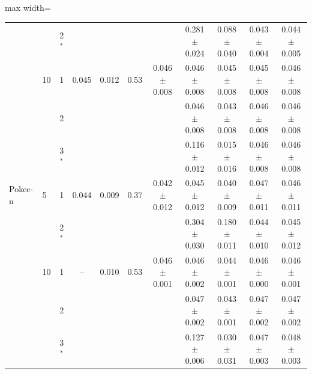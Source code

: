 \begin{table}[tbp]
\begin{adjustbox}{max width=\textwidth}
\begin{tabular}{llccccccccc}
 &  & 2$^\ast$ &  & &  &  & 0.281$\pm$0.024 & 0.088$\pm$0.040 & 0.043$\pm$0.004 & 0.044$\pm$0.005 \\
 & 10 & 1 & 0.045 & 0.012 & 0.53 & 0.046$\pm$0.008 & 0.046$\pm$0.008 & 0.045$\pm$0.008 & 0.045$\pm$0.008 & 0.046$\pm$0.008 \\
 &  & 2 &  & &  &  & 0.046$\pm$0.008 & 0.043$\pm$0.008 & 0.046$\pm$0.008 & 0.046$\pm$0.008 \\
 &  & 3$^\ast$ &  & &  &  & 0.116$\pm$0.012 & 0.015$\pm$0.016 & 0.046$\pm$0.008 & 0.046$\pm$0.008 \\
\midrule
Pokec-n & 5 & 1 & 0.044 & 0.009 & 0.37 & 0.042$\pm$0.012 & 0.045$\pm$0.012 & 0.040$\pm$0.009 & 0.047$\pm$0.011 & 0.046$\pm$0.011 \\
 &  & 2$^\ast$ &  & &  &  & 0.304$\pm$0.030 & 0.180$\pm$0.011 & 0.044$\pm$0.010 & 0.045$\pm$0.012 \\
 & 10 & 1 & -- & 0.010 & 0.53 & 0.046$\pm$0.001 & 0.046$\pm$0.002 & 0.044$\pm$0.001 & 0.046$\pm$0.000 & 0.046$\pm$0.001 \\
 &  & 2 &  & &  &  & 0.047$\pm$0.002 & 0.043$\pm$0.001 & 0.047$\pm$0.002 & 0.047$\pm$0.002 \\
 &  & 3$^\ast$ &  & &  &  & 0.127$\pm$0.006 & 0.030$\pm$0.031 & 0.047$\pm$0.003 & 0.048$\pm$0.003 \\
\bottomrule
\end{tabular}
\end{adjustbox}
\end{table}
